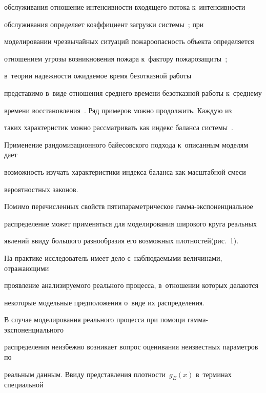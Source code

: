 обслуживания отношение ин\-тен\-сив\-ности входящего потока к~ин\-тен\-сив\-ности 


обслуживания определяет коэффициент загрузки сис\-те\-мы~\cite{BoPe1995}; при 


моделировании чрезвычайных ситуаций пожароопасность объекта определяется 


отношением угрозы возникновения пожара к~фактору пожарозащиты~\cite{ShaRaSha2010}; 


в~тео\-рии на\-деж\-ности ожи\-да\-емое время без\-отказ\-ной работы 


представимо в~виде отношения среднего времени без\-отказ\-ной работы к~среднему 


времени вос\-ста\-нов\-ле\-ния~\cite{ZdKo2004}. Ряд примеров можно продолжить. Каждую из 


таких характеристик можно рас\-смат\-ри\-вать как индекс баланса сис\-те\-мы~\cite{Ku2018}.


Применение рандомизационного байесовского подхода к~описанным моделям дает 


возможность изучать характеристики индекса баланса как мас\-штаб\-ной смеси 


вероятностных законов.





Помимо перечисленных свойств пятипараметрическое гам\-ма-экс\-по\-нен\-ци\-аль\-ное 


распределение может применяться для моделирования широкого круга реальных 


явлений ввиду большого разнообразия его возможных плотностей\linebreak (рис.~1).











На практике исследователь имеет дело с~наблюдаемыми величинами, отражающими 


проявление анализируемого реального процесса, в~отношении которых делаются 


некоторые модельные предположения о~виде их распределения.


В случае моделирования реального процесса при помощи гам\-ма-экс\-по\-нен\-ци\-аль\-но\-го 


распределения неизбежно возникает вопрос оценивания неизвестных па\-ра\-мет\-ров по 


реальным данным. Ввиду пред\-став\-ле\-ния плот\-ности~$g_E(x)$ в~терминах специальной 


